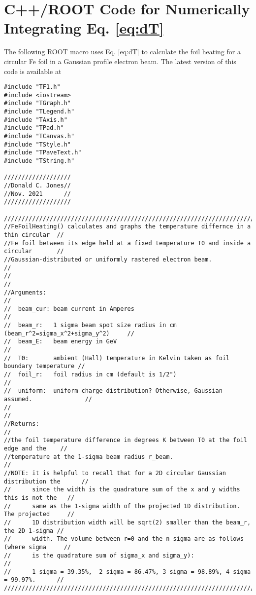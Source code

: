 \documentclass[12pt]{article}
\begin{document}
\section{C++/ROOT Code for Numerically Integrating Eq. \ref{eq:dT}}
The following ROOT macro uses Eq. \ref{eq:dT} to calculate the foil heating for a circular Fe foil in a Gaussian profile electron beam. The latest version of this code is available at 
\begin{lstlisting}
#include "TF1.h"
#include <iostream>
#include "TGraph.h"
#include "TLegend.h"
#include "TAxis.h"
#include "TPad.h"
#include "TCanvas.h"
#include "TStyle.h"
#include "TPaveText.h"
#include "TString.h"

///////////////////
//Donald C. Jones//
//Nov. 2021      //
///////////////////

////////////////////////////////////////////////////////////////////////////////////////
//FeFoilHeating() calculates and graphs the temperature differnce in a thin circular  //
//Fe foil between its edge held at a fixed temperature T0 and inside a circular       //
//Gaussian-distributed or uniformly rastered electron beam.                           //
//                                                                                    //
//Arguments:                                                                          //
//  beam_cur: beam current in Amperes                                                 //
//  beam_r:   1 sigma beam spot size radius in cm  (beam_r^2=sigma_x^2+sigma_y^2)     //
//  beam_E:   beam energy in GeV                                                      //
//  T0:       ambient (Hall) temperature in Kelvin taken as foil boundary temperature //
//  foil_r:   foil radius in cm (default is 1/2")                                     //
//  uniform:  uniform charge distribution? Otherwise, Gaussian assumed.               //
//                                                                                    //
//Returns:                                                                            //
//the foil temperature difference in degrees K between T0 at the foil edge and the    //
//temperature at the 1-sigma beam radius r_beam.                                      //
//NOTE: it is helpful to recall that for a 2D circular Gaussian distribution the      //
//      since the width is the quadrature sum of the x and y widths this is not the   //
//      same as the 1-sigma width of the projected 1D distribution. The projected     //
//      1D distribution width will be sqrt(2) smaller than the beam_r, the 2D 1-sigma //
//      width. The volume between r=0 and the n-sigma are as follows (where sigma     //
//      is the quadrature sum of sigma_x and sigma_y):                                //
//      1 sigma = 39.35%,  2 sigma = 86.47%, 3 sigma = 98.89%, 4 sigma = 99.97%.      //
////////////////////////////////////////////////////////////////////////////////////////


\end{lstlisting}
\end{document}
